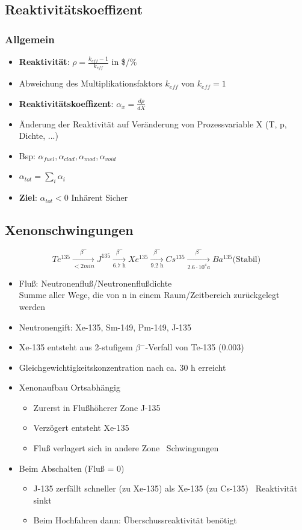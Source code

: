 \documentclass[12pt]{article}
\begin{document}
\subsection{Reaktivitätskoeffizent}
\subsubsection{Allgemein}
\begin{itemize}[noitemsep]
	\item \textbf{Reaktivität}: \(\rho = \frac{k_{eff} - 1}{k_{eff}}\) in \$/\%
	\item Abweichung des Multiplikationsfaktors \(k_{eff}\) von \(k_{eff} = 1\)
	\item \textbf{Reaktivitätskoeffizent}: \(\alpha_x = \frac{d\rho}{dX}\)
	\item Änderung der Reaktivität auf Veränderung von Prozessvariable X (T, p, Dichte, ...)
	\item Bsp: \(\alpha_{fuel}, \alpha_{clad}, \alpha_{mod}, \alpha_{void}\)
	\item \(\alpha_{tot} = \sum_{i}^{} \alpha_i\)
	\item \textbf{Ziel}: \(\alpha_{tot} < 0\) \textrightarrow Inhärent Sicher
\end{itemize}

\subsection{Xenonschwingungen}
\[
	Te^{135}
	\xrightarrow[< 2 min]{\beta^-}
	J^{135}
	\xrightarrow[\text{6.7 h}]{\beta^-}
	Xe^{135}
	\xrightarrow[\text{9.2 h}]{\beta^-}
	Cs^{135}
	\xrightarrow[2.6\cdot10^4a]{\beta^-}
	Ba^{135} \text{(Stabil)}
\]
\begin{itemize}[noitemsep]
	\item Fluß: Neutronenfluß/Neutronenflußdichte\\
		Summe aller Wege, die von n in einem Raum/Zeitbereich zurückgelegt werden
	\item Neutronengift: Xe-135, Sm-149, Pm-149, J-135
	\item Xe-135 entsteht aus 2-stufigem \(\beta^-\)-Verfall von Te-135 (0.003)
	\item Gleichgewichtigkeitskonzentration nach ca. 30 h erreicht
	\item Xenonaufbau Ortsabhängig
		\begin{itemize}[noitemsep]
			\item Zurerst in Flußhöherer Zone J-135
			\item Verzögert entsteht Xe-135
			\item Fluß verlagert sich in andere Zone \textrightarrow\ Schwingungen
		\end{itemize}
	\item Beim Abschalten (Fluß = 0)
		\begin{itemize}[noitemsep]
			\item J-135 zerfällt schneller (zu Xe-135) als Xe-135 (zu Cs-135) \textrightarrow\ Reaktivität sinkt
			\item Beim Hochfahren dann: Überschussreaktivität benötigt
		\end{itemize}
\end{itemize}
\end{document}
